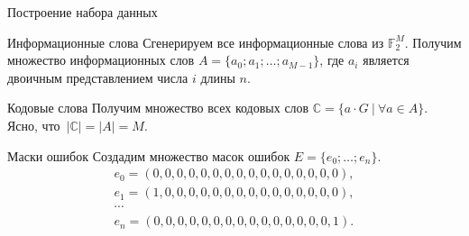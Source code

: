\documentclass{beamer}
\begin{document}
\begin{frame}{Построение набора данных}
\begin{block}{Информационные слова}
Сгенерируем все информационные слова из $\mathbb{F}_2^M$. Получим множество информационных слов $A = \{a_0; a_1; \dots; a_{M-1}\}$, где $a_i$ является двоичным представлением числа $i$ длины $n$.
\end{block}

\pause
\begin{block}{Кодовые слова}
Получим множество всех кодовых слов $\mathbb{C} = \{a\cdot G~|~\forall a \in A \}$. \\
Ясно, что~$|\mathbb{C}| = |A| = M$.
\end{block}
\pause
\begin{block}{Маски ошибок}
Создадим множество масок ошибок $E = \{e_0; \dots; e_n\}$.
\vspace*{-\baselineskip}
\begin{gather}
    \nonumber e_0 = (0, 0, 0, 0, 0, 0, 0, 0, 0, 0, 0, 0, 0, 0, 0, 0), \\
    \nonumber e_1 = (1, 0, 0, 0, 0, 0, 0, 0, 0, 0, 0, 0, 0, 0, 0, 0), \\
    \nonumber \cdots \\
    \nonumber e_n = (0, 0, 0, 0, 0, 0, 0, 0, 0, 0, 0, 0, 0, 0, 0, 1).
\end{gather}
\end{block}

\end{frame}
\end{document}
